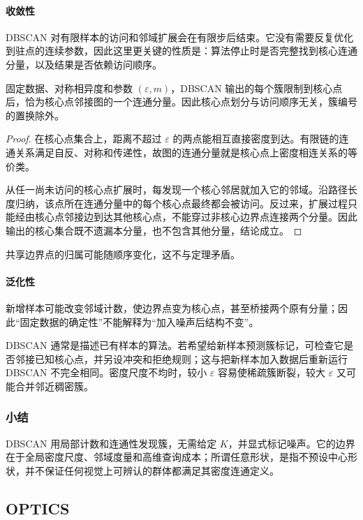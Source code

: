 \paragraph{收敛性}
DBSCAN 对有限样本的访问和邻域扩展会在有限步后结束。它没有需要反复优化到驻点的连续参数，因此这里更关键的性质是：算法停止时是否完整找到核心连通分量，以及结果是否依赖访问顺序。

\begin{theorem}
 \label{thm:clustering-dbscan}
 固定数据、对称相异度和参数 $(\varepsilon,m)$，DBSCAN 输出的每个簇限制到核心点后，恰为核心点邻接图的一个连通分量。因此核心点划分与访问顺序无关，簇编号的置换除外。
\end{theorem}
\begin{proof}
在核心点集合上，距离不超过 $\varepsilon$ 的两点能相互直接密度到达。有限链的连通关系满足自反、对称和传递性，故图的连通分量就是核心点上密度相连关系的等价类。

从任一尚未访问的核心点扩展时，每发现一个核心邻居就加入它的邻域。沿路径长度归纳，该点所在连通分量中的每个核心点最终都会被访问。反过来，扩展过程只能经由核心点邻接边到达其他核心点，不能穿过非核心边界点连接两个分量。因此输出的核心集合既不遗漏本分量，也不包含其他分量，结论成立。
\end{proof}

共享边界点的归属可能随顺序变化，这不与定理矛盾。

\paragraph{泛化性}
新增样本可能改变邻域计数，使边界点变为核心点，甚至桥接两个原有分量；因此“固定数据的确定性”不能解释为“加入噪声后结构不变”。

DBSCAN 通常是描述已有样本的算法。若希望给新样本预测簇标记，可检查它是否邻接已知核心点，并另设冲突和拒绝规则；这与把新样本加入数据后重新运行 DBSCAN 不完全相同。密度尺度不均时，较小 $\varepsilon$ 容易使稀疏簇断裂，较大 $\varepsilon$ 又可能合并邻近稠密簇。

\subsubsection{小结}

DBSCAN 用局部计数和连通性发现簇，无需给定 $K$，并显式标记噪声。它的边界在于全局密度尺度、邻域度量和高维查询成本；所谓任意形状，是指不预设中心形状，并不保证任何视觉上可辨认的群体都满足其密度连通定义。

\subsection{OPTICS}
\label{sec:clustering-optics}

